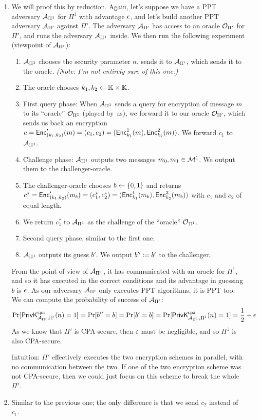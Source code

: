 \begin{solution}
\begin{enumerate}
	\item We will proof this by reduction. Again, let's suppose we have a PPT adversary $\A_{\Pi^1}$ for $\Pi^1$ with advantage $\negl$, and let's build another PPT adversary $\A_{\Pi'}$ against $\Pi'$. The adversary $\A_{\Pi'}$ has access to an oracle $\O_{\Pi'}$ for $\Pi'$, and runs the adversary $\A_{\Pi^1}$ inside. We then run the following experiment (viewpoint of $\A_{\Pi'}$):
	\begin{enumerate}[label=(\arabic*)]
		\item $\A_{\Pi^1}$ chooses the security parameter $n$, sends it to $\A_{\Pi'}$, which sends it to the oracle. \emph{(Note: I'm not entirely sure of this one.)}
		\item The oracle chooses $k_1, k_2 \pick \K \times \K$.
		\item First query phase: When $\A_{\Pi^1}$ sends a query for encryption of message $m$ to its ``oracle'' $\O_{\Pi^1}$ (played by us), we forward it to our oracle $\O_{\Pi'}$, which sends us back an encryption $c=\Enc'_{(k_1, k_2)}(m)=(c_1, c_2)=(\Enc^1_{k_1}(m), \Enc^2_{k_2}(m))$. We forward $c_1$ to $\A_{\Pi^1}$.
		\item Challenge phase: $\A_{\Pi^1}$ outputs two messages $m_0, m_1 \in \M^1$. We output them to the challenger-oracle.
		\item The challenger-oracle chooses $b \pick \{0, 1\}$ and returns $c^*=\Enc'_{(k_1, k_2)}(m_b)=(c^*_1, c^*_2)=(\Enc^1_{k_1}(m_b), \Enc^2_{k_2}(m_b))$ with $c_1$ and $c_2$ of equal length.
		\item We return $c^*_1$ to $\A_{\Pi^1}$ as the challenge of the ``oracle'' $\O_{\Pi^1}$.
		\item Second query phase, similar to the first one.
		\item $\A_{\Pi^1}$ outputs its guess $b'$. We output $b'' \define b'$ to the challenger.
	\end{enumerate}
	From the point of view of $\A_{\Pi^1}$, it has communicated with an oracle for $\Pi^1$,
	and so it has executed in the correct conditions and its advantage in guessing $b$ is $\negl$.
	As our adversary $\A_{\Pi'}$ only executes PPT algorithms, it is PPT too.
	We can compute the probability of success of $\A_{\Pi'}$:
	\[ \Pr[\PrivKcpa[\A_{\Pi'}, \Pi'](n)=1] = \Pr[b''=b] = \Pr[b'=b] = \Pr[\PrivKcpa[\A_{\Pi^1}, \Pi^1](n)=1] = \frac12 + \negl \]
	As we know that $\Pi'$ is CPA-secure, then $\negl$ must be negligible, and so $\Pi^1$ is also CPA-secure.

	Intuition: $\Pi'$ effectively executes the two encryption schemes in parallel, with no communication between the two. If one of the two encryption scheme was not CPA-secure, then we could just focus on this scheme to break the whole $\Pi'$.

	\item Similar to the previous one; the only difference is that we send $c_2$ instead of $c_1$.
\end{enumerate}

\end{solution}

